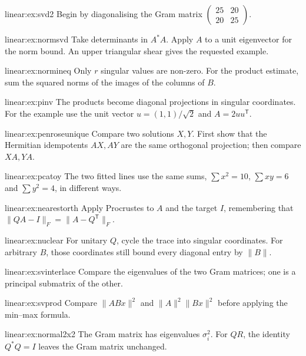 \begin{hint}{linear:ex:svd2}
Begin by diagonalising the Gram matrix $\begin{pmatrix}25&20\\20&25\end{pmatrix}$.
\end{hint}
\begin{hint}{linear:ex:normsvd}
Take determinants in $A^*A$. Apply $A$ to a unit eigenvector for the norm bound. An upper triangular shear gives the requested example.
\end{hint}
\begin{hint}{linear:ex:normineq}
Only $r$ singular values are non-zero. For the product estimate, sum the squared norms of the images of the columns of $B$.
\end{hint}
\begin{hint}{linear:ex:pinv}
The products become diagonal projections in singular coordinates. For the example use the unit vector $u=(1,1)/\sqrt2$ and $A=2uu^{\mathsf T}$.
\end{hint}
\begin{hint}{linear:ex:penroseunique}
Compare two solutions $X,Y$. First show that the Hermitian idempotents $AX,AY$ are the same orthogonal projection; then compare $XA,YA$.
\end{hint}
\begin{hint}{linear:ex:pcatoy}
The two fitted lines use the same sums, $\sum x^2=10$, $\sum xy=6$ and $\sum y^2=4$, in different ways.
\end{hint}
\begin{hint}{linear:ex:nearestorth}
Apply Procrustes to $A$ and the target $I$, remembering that $\|QA-I\|_F=\|A-Q^{\mathsf T}\|_F$.
\end{hint}
\begin{hint}{linear:ex:nuclear}
For unitary $Q$, cycle the trace into singular coordinates. For arbitrary $B$, those coordinates still bound every diagonal entry by $\|B\|$.
\end{hint}
\begin{hint}{linear:ex:svinterlace}
Compare the eigenvalues of the two Gram matrices; one is a principal submatrix of the other.
\end{hint}
\begin{hint}{linear:ex:svprod}
Compare $\|ABx\|^2$ and $\|A\|^2\|Bx\|^2$ before applying the min--max formula.
\end{hint}
\begin{hint}{linear:ex:normal2x2}
The Gram matrix has eigenvalues $\sigma_i^2$. For $QR$, the identity $Q^*Q=I$ leaves the Gram matrix unchanged.
\end{hint}
